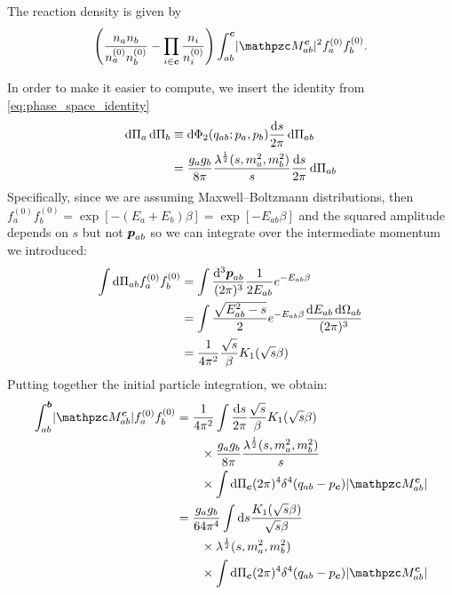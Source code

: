 \documentclass[
  a4paper,             %
  11pt,                %
  oneside,             %
  onecolumn,           %
  bibliography=totoc,  %
  final,               %
]{scrartcl}
\begin{document}
The reaction density is given by
\begin{equation}
  \left( \frac{n_a n_b}{n_a^{(0)} n_b^{(0)}} - \prod_{i \in \vt c} \frac{n_i}{n_i^{(0)}} \right) \int_{ab}^{\vt c} \abs{\pzcM_{ab}^{\vt c}}^2 f_a^{(0)} f_b^{(0)}.
\end{equation}

In order to make it easier to compute, we insert the identity from \cref{eq:phase_space_identity}
\begin{equation}
  \begin{aligned}
    \dd \Pi_a \dd \Pi_b &\equiv \dd \Phi_2(q_{ab}; p_a, p_b) \ddbar s \dd \Pi_{ab} \\
    &= \frac{g_a g_b}{8 \pi} \frac{\lambda^\frac{1}{2}(s, m_a^2, m_b^2)}{s} \ddbar s \dd\Pi_{ab}
  \end{aligned}
\end{equation}
Specifically, since we are assuming Maxwell--Boltzmann distributions, then
\(f_a^{(0)} f_b^{(0)} = \exp[-(E_a + E_b) \beta] = \exp[-E_{ab} \beta]\) and the
squared amplitude depends on \(s\) but not \(\boldsymbol{p}_{ab}\) so we can integrate
over the intermediate momentum we introduced:
\begin{equation}
  \begin{aligned}
    \int \dd \Pi_{ab} f_a^{(0)} f_b^{(0)}
    &= \int \ddbar^3{\vt p_{ab}} \frac{1}{2 E_{ab}} e^{- E_{ab} \beta} \\
    &= \int \frac{\sqrt{E_{ab}^2 - s}}{2} e^{- E_{ab} \beta} \frac{\dd E_{ab} \dd \Omega_{ab}}{(2 \pi)^3} \\
    &= \frac{1}{4 \pi^2} \frac{\sqrt{s}}{\beta} K_1(\sqrt{s} \beta)
  \end{aligned}
\end{equation}
Putting together the initial particle integration, we obtain:
\begin{equation}
  \begin{aligned}
    \int_{ab}^{\vt b} \abs{\pzcM_{ab}^{\vt c}} f_a^{(0)} f_b^{(0)}
    &= \frac{1}{4 \pi^2} \int \ddbar s \frac{\sqrt{s}}{\beta} K_1(\sqrt{s} \beta) \\
    &\qquad \times \frac{g_a g_b}{8 \pi} \frac{\lambda^\frac{1}{2}(s, m_a^2, m_b^2)}{s} \\
    &\qquad \times \int \dd \Pi_{\vt c} (2\pi)^4 \delta^4(q_{ab} - p_{\vt c}) \abs{\pzcM_{ab}^{\vt c}} \\
    &= \frac{g_a g_b}{64 \pi^4} \int \dd s \frac{K_1(\sqrt{s} \beta)}{\sqrt{s} \beta} \\
    &\qquad \times \lambda^\frac{1}{2}(s, m_a^2, m_b^2) \\
    &\qquad \times \int \dd \Pi_{\vt c} (2\pi)^4 \delta^4(q_{ab} - p_{\vt c}) \abs{\pzcM_{ab}^{\vt c}}
  \end{aligned}
\end{equation}
\end{document}
